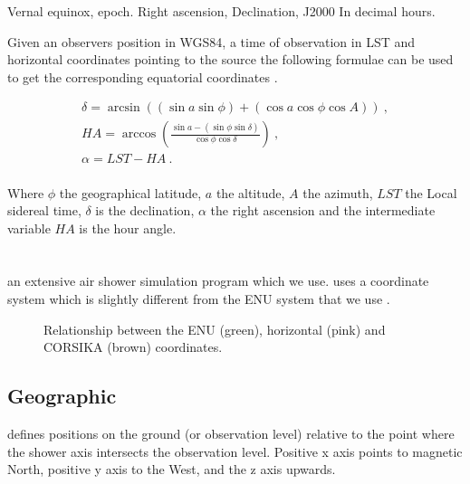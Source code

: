 Vernal equinox, epoch.
Right ascension, Declination, J2000
In decimal hours.

Given an observers position in WGS84, a time of observation in LST and
horizontal coordinates pointing to the source the following formulae can
be used to get the corresponding equatorial coordinates \cite[p.
37]{duffet-smith:1990aa}.

\begin{equation}
    \begin{array}{l}
        \delta = \arcsin{((\sin{a} \sin{\phi}) +
                          (\cos{a} \cos{\phi} \cos{A}))} \ , \\
        \mathit{HA} = \arccos{(\frac{\sin{a} - (\sin{\phi} \sin{\delta})}
                                    {\cos{\phi} \cos{\delta}})} \ , \\
        \alpha = \mathit{LST} - \mathit{HA} \ . \\
    \end{array}
\end{equation}

Where $\phi$ the geographical latitude, $a$ the altitude, $A$ the
azimuth, $\mathit{LST}$ the Local sidereal time, $\delta$ is the
declination, $\alpha$ the right ascension and the intermediate variable
$\mathit{HA}$ is the hour angle.


\section{\corsika}

\corsika an extensive air shower simulation program which we use.
\corsika uses a coordinate system which is slightly different from the
ENU system that we use \cite{heck:2013aa}.

\begin{figure}
    \centering
    
    \caption{Relationship between the ENU (green), horizontal (pink)
             and CORSIKA (brown) coordinates.}
    \label{fig:enu_corsika}
\end{figure}


\subsection{Geographic}

\corsika defines positions on the ground (or observation level) relative
to the point where the shower axis intersects the observation level.
Positive x axis points to magnetic North, positive y axis to the West,
and the z axis upwards.

